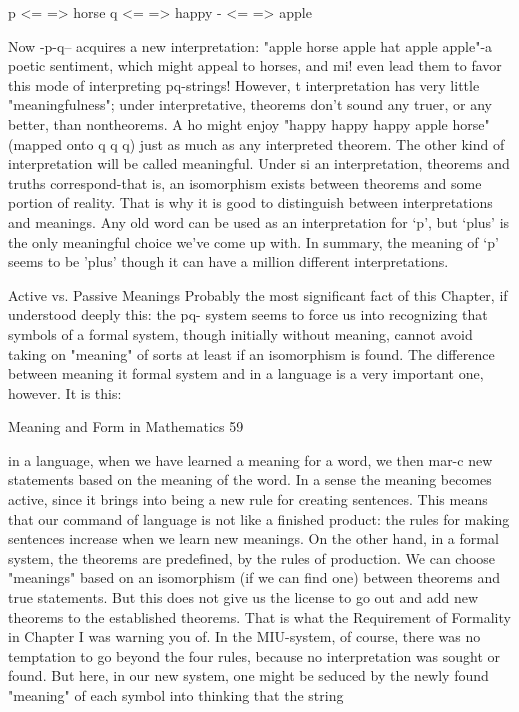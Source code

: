                                         p <= => horse
                                        q <= => happy
                                        - <= => apple


         Now -p-q-- acquires a new interpretation: "apple horse apple hat apple apple"-a
poetic sentiment, which might appeal to horses, and mi! even lead them to favor this
mode of interpreting pq-strings! However, t interpretation has very little
"meaningfulness"; under interpretative, theorems don't sound any truer, or any better,
than nontheorems. A ho might enjoy "happy happy happy apple horse" (mapped onto q q
q) just as much as any interpreted theorem.
         The other kind of interpretation will be called meaningful. Under si an
interpretation, theorems and truths correspond-that is, an isomorphism exists between
theorems and some portion of reality. That is why it is good to distinguish between
interpretations and meanings. Any old word can be used as an interpretation for `p', but
`plus' is the only meaningful choice we've come up with. In summary, the meaning of `p'
seems to be 'plus’ though it can have a million different interpretations.

                           Active vs. Passive Meanings
Probably the most significant fact of this Chapter, if understood deeply this: the pq-
system seems to force us into recognizing that symbols of a formal system, though
initially without meaning, cannot avoid taking on "meaning" of sorts at least if an
isomorphism is found. The difference between meaning it formal system and in a
language is a very important one, however. It is this:




Meaning and Form in Mathematics                                                       59

in a language, when we have learned a meaning for a word, we then mar-c new
statements based on the meaning of the word. In a sense the meaning becomes active,
since it brings into being a new rule for creating sentences. This means that our command
of language is not like a finished product: the rules for making sentences increase when
we learn new meanings. On the other hand, in a formal system, the theorems are
predefined, by the rules of production. We can choose "meanings" based on an
isomorphism (if we can find one) between theorems and true statements. But this does
not give us the license to go out and add new theorems to the established theorems. That
is what the Requirement of Formality in Chapter I was warning you of.
        In the MIU-system, of course, there was no temptation to go beyond the four
rules, because no interpretation was sought or found. But here, in our new system, one
might be seduced by the newly found "meaning" of each symbol into thinking that the
string

